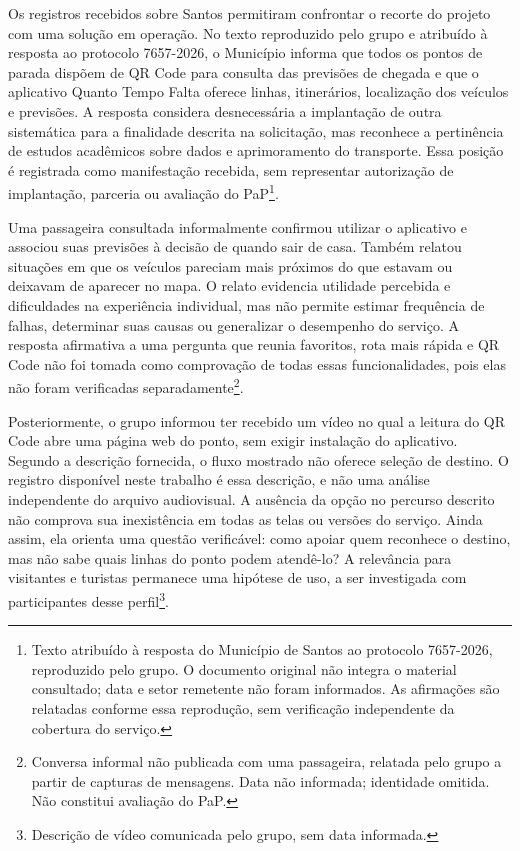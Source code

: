 Os registros recebidos sobre Santos permitiram confrontar o recorte do projeto com uma solução em operação. No texto reproduzido pelo grupo e atribuído à resposta ao protocolo 7657-2026, o Município informa que todos os pontos de parada dispõem de QR Code para consulta das previsões de chegada e que o aplicativo Quanto Tempo Falta oferece linhas, itinerários, localização dos veículos e previsões. A resposta considera desnecessária a implantação de outra sistemática para a finalidade descrita na solicitação, mas reconhece a pertinência de estudos acadêmicos sobre dados e aprimoramento do transporte. Essa posição é registrada como manifestação recebida, sem representar autorização de implantação, parceria ou avaliação do PaP\footnote{Texto atribuído à resposta do Município de Santos ao protocolo 7657-2026, reproduzido pelo grupo. O documento original não integra o material consultado; data e setor remetente não foram informados. As afirmações são relatadas conforme essa reprodução, sem verificação independente da cobertura do serviço.}.

Uma passageira consultada informalmente confirmou utilizar o aplicativo e associou suas previsões à decisão de quando sair de casa. Também relatou situações em que os veículos pareciam mais próximos do que estavam ou deixavam de aparecer no mapa. O relato evidencia utilidade percebida e dificuldades na experiência individual, mas não permite estimar frequência de falhas, determinar suas causas ou generalizar o desempenho do serviço. A resposta afirmativa a uma pergunta que reunia favoritos, rota mais rápida e QR Code não foi tomada como comprovação de todas essas funcionalidades, pois elas não foram verificadas separadamente\footnote{Conversa informal não publicada com uma passageira, relatada pelo grupo a partir de capturas de mensagens. Data não informada; identidade omitida. Não constitui avaliação do PaP.}.

Posteriormente, o grupo informou ter recebido um vídeo no qual a leitura do QR Code abre uma página web do ponto, sem exigir instalação do aplicativo. Segundo a descrição fornecida, o fluxo mostrado não oferece seleção de destino. O registro disponível neste trabalho é essa descrição, e não uma análise independente do arquivo audiovisual. A ausência da opção no percurso descrito não comprova sua inexistência em todas as telas ou versões do serviço. Ainda assim, ela orienta uma questão verificável: como apoiar quem reconhece o destino, mas não sabe quais linhas do ponto podem atendê-lo? A relevância para visitantes e turistas permanece uma hipótese de uso, a ser investigada com participantes desse perfil\footnote{Descrição de vídeo comunicada pelo grupo, sem data informada.}.

